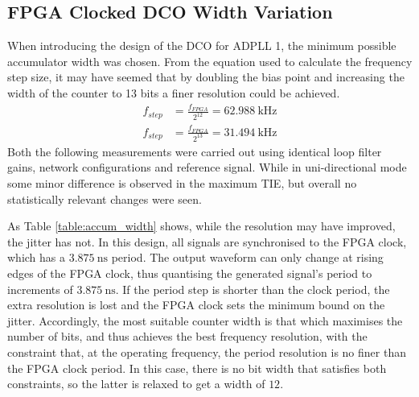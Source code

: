 \subsection{\ac{FPGA} Clocked \ac{DCO} Width Variation}
When introducing the design of the \ac{DCO} for \ac{ADPLL} 1, the minimum possible accumulator width was chosen. From the equation used to calculate the frequency step size, it may have seemed that by doubling the bias point and increasing the width of the counter to 13 bits a finer resolution could be achieved.
\begin{align}
f_{step} &= \frac{f_{FPGA}}{2^{12}} = 62.988~\si{\kilo\hertz} \\
f_{step} &= \frac{f_{FPGA}}{2^{13}} = 31.494~\si{\kilo\hertz}
\end{align} Both the following measurements were carried out using identical loop filter gains, network configurations and reference signal. While in uni-directional mode some minor difference is observed in the maximum \ac{TIE}, but overall no statistically relevant changes were seen.

As Table \ref{table:accum_width} shows, while the resolution may have improved, the jitter has not. In this design, all signals are synchronised to the \ac{FPGA} clock, which has a $3.875~\si{\nano\second}$ period. The output waveform can only change at rising edges of the \ac{FPGA} clock, thus quantising the generated signal's period to increments of $3.875~\si{\nano\second}$. If the period step is shorter than the clock period, the extra resolution is lost and the \ac{FPGA} clock sets the minimum bound on the jitter. Accordingly, the most suitable counter width is that which maximises the number of bits, and thus achieves the best frequency resolution, with the constraint that, at the operating frequency, the period resolution is no finer than the \ac{FPGA} clock period. In this case, there is no bit width that satisfies both constraints, so the latter is relaxed to get a width of $12$.

